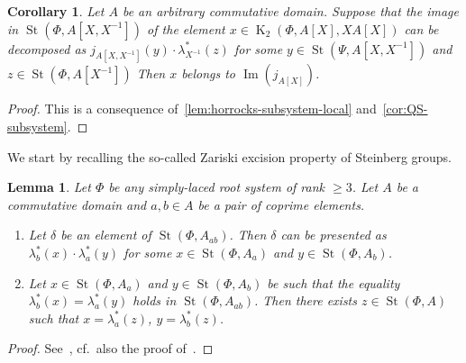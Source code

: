 \documentclass[oneside, 10pt]{amsart}
\DeclareMathOperator{\St}{St}
\DeclareMathOperator{\K}{K}
\DeclareMathOperator{\Img}{Im}
\newcommand{\inv}{^{-1}}
\numberwithin{equation}{section}
\numberwithin{thm}{section}
\newtheorem{lemma}[thm]{Lemma}
\numberwithin{lemma}{section}
\newtheorem{cor}[thm]{Corollary}
\theoremstyle{definition}
\theoremstyle{remark}
\begin{document}
\begin{cor} \label{cor:horrocks--ingredient}
Let $A$ be an arbitrary commutative domain.
Suppose that the image in $\St(\Phi, A[X, X\inv])$ of the element $x \in \K_2(\Phi, A[X], XA[X])$
can be decomposed as $j_{A[X, X\inv]}(y) \cdot \lambda_{X^{-1}}^*(z)$ for
some $y \in \St(\Psi, A[X, X\inv])$ and $z \in \St(\Phi, A[X\inv])$
Then $x$ belongs to $\Img(j_{A[X]})$.
\end{cor}
\begin{proof}
This is a consequence of~\cref{lem:horrocks-subsystem-local} and~\cref{cor:QS-subsystem}.
\end{proof}

We start by recalling the so-called Zariski excision property of Steinberg groups.
\begin{lemma} \label{lem:zariski-glueing}
Let $\Phi$ be any simply-laced root system of rank $\geq 3$.
Let $A$ be a commutative domain and $a, b \in A$ be a pair of coprime elements.
\begin{enumerate}
\item Let $\delta$ be an element of $\St(\Phi, A_{ab})$.
Then $\delta$ can be presented as $\lambda_b^*(x) \cdot \lambda_a^*(y)$ for some
$x  \in \St(\Phi, A_a)$ and $y \in \St(\Phi, A_b)$.
\item  Let $x \in \St(\Phi, A_a)$ and $y \in \St(\Phi, A_b)$ be such that the equality $\lambda_b^*(x) = \lambda_a^*(y)$ holds in $\St(\Phi, A_{ab})$.
Then there exists $z \in \St(\Phi, A)$ such that $x = \lambda_a^*(z)$, $y = \lambda_b^*(z)$.
\end{enumerate}
\end{lemma}
\begin{proof}
See~\cite[Corollary~4.5]{LSV2}, cf.\ also the proof of~\cite[Lemma~2.6]{LSV2}.
\end{proof}
\end{document}
